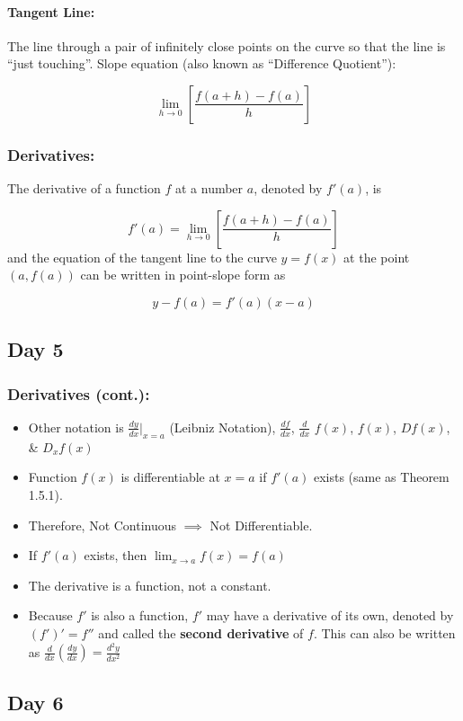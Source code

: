\documentclass[12pt]{article}
\begin{document}
\paragraph{Tangent Line:} The line through a pair of infinitely close points on the curve so that the line is ``just touching''. Slope equation (also known as ``Difference Quotient''):

$$\lim_{h \to 0} \left [ \frac{f(a+h)-f(a)}{h} \right ]$$

\subsubsection{Derivatives:} The derivative of a function $f$ at a number $a$, denoted by $f'(a)$, is 

$$f'(a) = \lim_{h \to 0} \left [ \frac{f(a+h)-f(a)}{h} \right ]$$
and the equation of the tangent line to the curve $y=f(x)$ at the point $(a,f(a))$ can be written in point-slope form as

$$y-f(a)=f'(a)(x-a)$$

\subsection{Day 5}
\subsubsection{Derivatives (cont.):}
\begin{itemize}
    \item Other notation is $\frac{d y}{d x} |_{x=a}$ (Leibniz Notation),  $\frac{d f}{d x}$, $\frac{d}{d x}$ $f(x)$, $f(x)$, $D f(x)$, \& $D_{x} f(x)$
    \item Function $f(x)$ is differentiable at $x=a$ if $f'(a)$ exists (same as Theorem 1.5.1).
    \item Therefore, Not Continuous $\implies$ Not Differentiable.
    \item If $f'(a)$ exists, then $\lim_{x \to a} f(x) = f(a)$
    \item The derivative is a function, not a constant.
    \item Because $f'$ is also a function, $f'$ may have a derivative of its own, denoted by $(f')' = f''$ and called the \textbf{second derivative} of $f$. This can also be written as $\frac{d}{d x} \left ( \frac{d y}{d x} \right ) = \frac{d^2 y}{dx^2}$
\end{itemize}


\subsection{Day 6}
\end{document}
